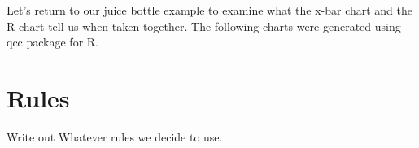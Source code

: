 \documentclass{ximera}
\begin{document}
Let's return to our juice bottle example to examine what the x-bar chart and the R-chart tell us when taken together.  The following charts were generated using qcc package for R.

\begin{center}
       \end{center}





\section*{Rules}
Write out Whatever rules we decide to use.  
\end{document}
